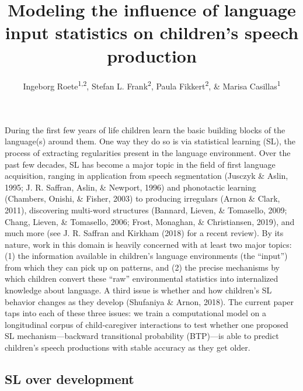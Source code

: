 \documentclass[man,mask,floatsintext]{apa6}
\title{Modeling the influence of language input statistics on children's speech
production}
\author{Ingeborg Roete\textsuperscript{1,2}, Stefan L. Frank\textsuperscript{2},
Paula Fikkert\textsuperscript{2}, \& Marisa Casillas\textsuperscript{1}}
\date{}
\affiliation{
\vspace{0.5cm}
\textsuperscript{1} Max Planck Institute for Psycholinguistics\\\textsuperscript{2} Radboud University}
\begin{document}
\maketitle

During the first few years of life children learn the basic building
blocks of the language(s) around them. One way they do so is via
statistical learning (SL), the process of extracting regularities
present in the language environment. Over the past few decades, SL has
become a major topic in the field of first language acquisition, ranging
in application from speech segmentation (Jusczyk \& Aslin, 1995; J. R.
Saffran, Aslin, \& Newport, 1996) and phonotactic learning (Chambers,
Onishi, \& Fisher, 2003) to producing irregulars (Arnon \& Clark, 2011),
discovering multi-word structures (Bannard, Lieven, \& Tomasello, 2009;
Chang, Lieven, \& Tomasello, 2006; Frost, Monaghan, \& Christiansen,
2019), and much more (see J. R. Saffran and Kirkham (2018) for a recent
review). By its nature, work in this domain is heavily concerned with at
least two major topics: (1) the information available in children's
language environments (the \enquote{input}) from which they can pick up
on patterns, and (2) the precise mechanisms by which children convert
these \enquote{raw} environmental statistics into internalized knowledge
about language. A third issue is whether and how children's SL behavior
changes as they develop (Shufaniya \& Arnon, 2018). The current paper
taps into each of these three issues: we train a computational model on
a longitudinal corpus of child-caregiver interactions to test whether
one proposed SL mechanism---backward transitional probability (BTP)---is
able to predict children's speech productions with stable accuracy as
they get older.

\subsection{SL over development}\label{sl-over-development}
\end{document}
